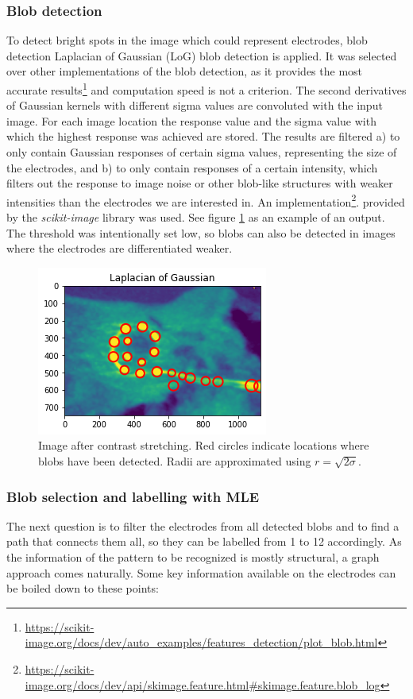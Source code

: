 \documentclass[a4paper, 11pt]{article}
\begin{document}
\subsubsection{Blob detection}
To detect bright spots in the image which could represent electrodes, blob detection Laplacian of Gaussian (LoG) blob detection is applied. It was selected over other implementations of the blob detection, as it provides the most accurate results\footnote{\url{https://scikit-image.org/docs/dev/auto_examples/features_detection/plot_blob.html}} and computation speed is not a criterion. The second derivatives of Gaussian kernels with different sigma values are convoluted with the input image. For each image location the response value and the sigma value with which the highest response was achieved are stored. The results are filtered a) to only contain Gaussian responses of certain sigma values, representing the size of the electrodes, and b) to only contain responses of a certain intensity, which filters out the response to image noise or other blob-like structures with weaker intensities than the electrodes we are interested in. An implementation\footnote{\url{https://scikit-image.org/docs/dev/api/skimage.feature.html#skimage.feature.blob_log}}.
provided by the \emph{scikit-image} \cite{scikit-image} library was used.
See figure \ref{blobs_detected} as an example of an output. The threshold was intentionally set low, so blobs can also be detected in images where the electrodes are differentiated weaker.

\begin{figure}[ht]
	\centering
  \includegraphics[width=.5\textwidth]{blobs_detected.png}
	\caption{Image after contrast stretching. Red circles indicate locations where blobs have been detected. Radii are approximated using $r=\sqrt{2\sigma}$.}
	\label{blobs_detected}
\end{figure}

\subsubsection{Blob selection and labelling with MLE}
The next question is to filter the electrodes from all detected blobs and to find a path that connects them all, so they can be labelled from 1 to 12 accordingly.  
As the information of the pattern to be recognized is mostly structural, a graph approach comes naturally. Some key information available on the electrodes can be boiled down to these points:
\end{document}
